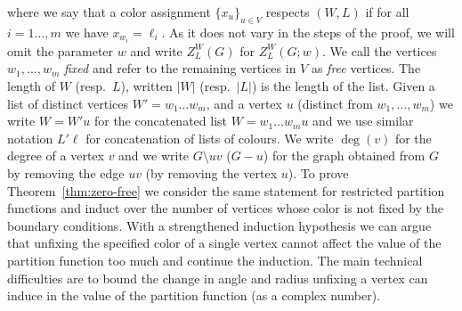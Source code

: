 \documentclass[10pt,a4paper]{article}
\theoremstyle{definition}
\begin{document}
where we say that a color assignment $\{x_u\}_{u\in V}$ respects $(W,L)$ if for all $i=1\ldots, m$ we have $x_{w_i}=\ell_i$.
As it does not vary in the steps of the proof, we will omit the parameter $w$ and write $Z^W_L(G)$ for $Z^W_L(G;w)$.
We call the vertices $w_1,\ldots,w_m$ \emph{fixed} and refer to the remaining vertices in $V$ as \emph{free} vertices. The length of $W$ (resp.\ $L$), written $|W|$ (resp.\ $|L|$) is the length of the list.
Given a list of distinct vertices $W' = w_1\ldots w_m$, and a vertex $u$ (distinct from $w_1, \ldots, w_m$) we write $W = W'u$ for the concatenated list $W = w_1\ldots w_m u$ and we use similar notation $L'\ell$ for concatenation of lists of colours.  We write $\deg(v)$ for the degree of a vertex $v$ and we write $G\setminus uv$ ($G-u$) for the graph obtained from $G$ by removing the edge $uv$ (by removing the vertex $u$). 
%
%
%
To prove Theorem~\ref{thm:zero-free} we consider the same statement for restricted partition functions and induct over the number of vertices whose color is not fixed by the boundary conditions.
With a strengthened induction hypothesis we can argue that unfixing the specified color of a single vertex cannot affect the value of the partition function too much and continue the induction. 
The main technical difficulties are to bound the change in angle and radius unfixing a vertex can induce in the value of the partition function (as a complex number). 
%
\end{document}
